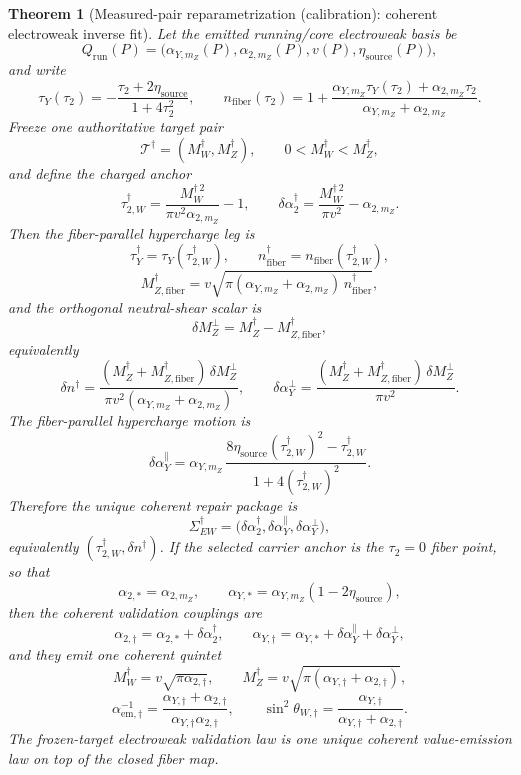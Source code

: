 \documentclass[11pt]{article}
\newtheorem{theorem}{Theorem}[section]
\begin{document}
\begin{theorem}[Measured-pair reparametrization (calibration): coherent electroweak inverse fit]
Let the emitted running/core electroweak basis be
\[
Q_{\mathrm{run}}(P)=
\bigl(\alpha_{Y,m_Z}(P),\alpha_{2,m_Z}(P),v(P),\eta_{\mathrm{source}}(P)\bigr),
\]
and write
\[
\tau_Y(\tau_2)
=
-\frac{\tau_2+2\eta_{\mathrm{source}}}{1+4\tau_2^2},
\qquad
n_{\mathrm{fiber}}(\tau_2)
=
1+\frac{\alpha_{Y,m_Z}\tau_Y(\tau_2)+\alpha_{2,m_Z}\tau_2}
{\alpha_{Y,m_Z}+\alpha_{2,m_Z}}.
\]
Freeze one authoritative target pair
\[
\mathcal T^\dagger=(M_W^\dagger,M_Z^\dagger),
\qquad 0<M_W^\dagger<M_Z^\dagger,
\]
and define the charged anchor
\[
\tau_{2,W}^\dagger
=
\frac{M_W^{\dagger\,2}}{\pi v^2\alpha_{2,m_Z}}-1,
\qquad
\delta\alpha_2^\dagger
=
\frac{M_W^{\dagger\,2}}{\pi v^2}-\alpha_{2,m_Z}.
\]
Then the fiber-parallel hypercharge leg is
\[
\tau_Y^\dagger=\tau_Y(\tau_{2,W}^\dagger),
\qquad
n_{\mathrm{fiber}}^\dagger=n_{\mathrm{fiber}}(\tau_{2,W}^\dagger),
\]
\[
M_{Z,\mathrm{fiber}}^\dagger
=
v\sqrt{\pi(\alpha_{Y,m_Z}+\alpha_{2,m_Z})\,n_{\mathrm{fiber}}^\dagger},
\]
and the orthogonal neutral-shear scalar is
\[
\delta M_Z^\perp=M_Z^\dagger-M_{Z,\mathrm{fiber}}^\dagger,
\]
equivalently
\[
\delta n^\dagger
=
\frac{(M_Z^\dagger+M_{Z,\mathrm{fiber}}^\dagger)\,\delta M_Z^\perp}
{\pi v^2(\alpha_{Y,m_Z}+\alpha_{2,m_Z})},
\qquad
\delta\alpha_Y^\perp
=
\frac{(M_Z^\dagger+M_{Z,\mathrm{fiber}}^\dagger)\,\delta M_Z^\perp}{\pi v^2}.
\]
The fiber-parallel hypercharge motion is
\[
\delta\alpha_Y^\parallel
=
\alpha_{Y,m_Z}\,
\frac{8\eta_{\mathrm{source}}(\tau_{2,W}^\dagger)^2-\tau_{2,W}^\dagger}
{1+4(\tau_{2,W}^\dagger)^2}.
\]
Therefore the unique coherent repair package is
\[
\Sigma_{EW}^\dagger
=
\bigl(\delta\alpha_2^\dagger,\delta\alpha_Y^\parallel,\delta\alpha_Y^\perp\bigr),
\]
equivalently \((\tau_{2,W}^\dagger,\delta n^\dagger)\). If the selected carrier anchor is the
\(\tau_2=0\) fiber point, so that
\[
\alpha_{2,*}=\alpha_{2,m_Z},
\qquad
\alpha_{Y,*}=\alpha_{Y,m_Z}(1-2\eta_{\mathrm{source}}),
\]
then the coherent validation couplings are
\[
\alpha_{2,\dagger}=\alpha_{2,*}+\delta\alpha_2^\dagger,
\qquad
\alpha_{Y,\dagger}=\alpha_{Y,*}+\delta\alpha_Y^\parallel+\delta\alpha_Y^\perp,
\]
and they emit one coherent quintet
\[
M_W^\dagger=v\sqrt{\pi\alpha_{2,\dagger}},
\qquad
M_Z^\dagger=v\sqrt{\pi(\alpha_{Y,\dagger}+\alpha_{2,\dagger})},
\]
\[
\alpha_{\mathrm{em},\dagger}^{-1}
=
\frac{\alpha_{Y,\dagger}+\alpha_{2,\dagger}}
{\alpha_{Y,\dagger}\alpha_{2,\dagger}},
\qquad
\sin^2\theta_{W,\dagger}
=
\frac{\alpha_{Y,\dagger}}{\alpha_{Y,\dagger}+\alpha_{2,\dagger}}.
\]
The frozen-target electroweak validation law is one unique coherent value-emission law on top of
the closed fiber map.
\end{theorem}
\end{document}
